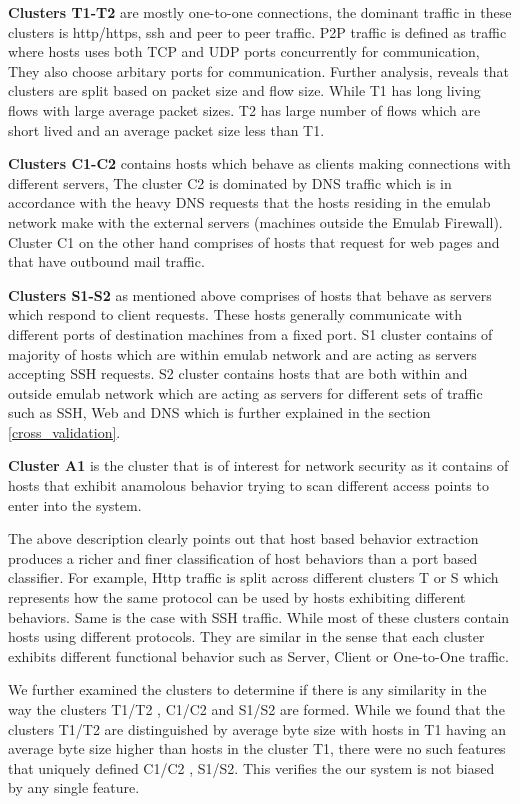 \textbf{Clusters T1-T2} are mostly one-to-one connections, the dominant traffic in these clusters is http/https, ssh and peer to peer traffic. P2P traffic is defined as traffic where hosts uses both TCP and UDP ports concurrently for communication, They also choose arbitary ports for communication. Further analysis, reveals that clusters are split based on packet size and flow size.
While T1 has long living flows with large average packet sizes. T2 has large number of flows which are short lived and an average packet size less than T1.

\textbf{Clusters C1-C2} contains hosts which behave as clients  making connections with different servers, The cluster C2 is dominated by DNS traffic which is in accordance with the heavy DNS requests that the hosts residing in the emulab network make with the external servers (machines outside the Emulab Firewall). Cluster C1 on the other hand comprises of hosts that request for web pages and that have outbound mail traffic.

\textbf{Clusters S1-S2} as mentioned above comprises of hosts that behave as servers which respond to client requests. These hosts generally communicate with different ports of destination machines from a fixed port. S1 cluster contains of majority of hosts which are within emulab network and are acting as servers accepting SSH requests. S2 cluster contains hosts that are both within and outside emulab network which are acting as servers for different sets of traffic such as SSH, Web and DNS which is further explained in the section \ref{cross_validation}. 

\textbf{Cluster A1} is the cluster that is of interest for network security as it contains of hosts that exhibit anamolous behavior trying to scan different access points to enter into the system.

The above description clearly points out that host based behavior extraction produces a richer and finer classification of host behaviors than a port based classifier. For example, Http traffic is split across different clusters T or S which represents how the same protocol can be used by hosts exhibiting different behaviors. Same is the case with SSH traffic. While most of these clusters contain hosts using different protocols. They are similar in the sense that each cluster exhibits different functional behavior such as Server, Client or One-to-One traffic.

We further examined the clusters to determine if there is any similarity in the way the clusters T1/T2 , C1/C2 and S1/S2 are formed. While we found that the clusters T1/T2 are distinguished by average byte size with hosts in T1 having an average byte size higher than hosts in the cluster T1, there were no such features that uniquely defined C1/C2 , S1/S2. This verifies the our system is not biased by any single feature.

